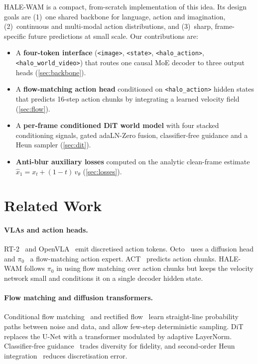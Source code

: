 \documentclass[11pt]{article}
\newcommand{\tok}[1]{\texttt{<#1>}}
\begin{document}
HALE-WAM is a compact, from-scratch implementation of this idea. Its design goals are
(1)~one shared backbone for language, action and imagination, (2)~continuous and multi-modal
action distributions, and (3)~sharp, frame-specific future predictions at small scale.
Our contributions are:
\begin{itemize}
  \item A \textbf{four-token interface} (\tok{image}, \tok{state}, \tok{halo\_action},
        \tok{halo\_world\_video}) that routes one causal MoE decoder to three output heads
        (\cref{sec:backbone}).
  \item A \textbf{flow-matching action head} conditioned on \tok{halo\_action} hidden
        states that predicts 16-step action chunks by integrating a learned velocity field
        (\cref{sec:flow}).
  \item A \textbf{per-frame conditioned DiT world model} with four stacked conditioning
        signals, gated adaLN-Zero fusion, classifier-free guidance and a Heun sampler
        (\cref{sec:dit}).
  \item \textbf{Anti-blur auxiliary losses} computed on the analytic clean-frame estimate
        $\hat x_1=x_t+(1-t)\,v_\theta$ (\cref{sec:losses}).
\end{itemize}

\section{Related Work}

\paragraph{VLAs and action heads.} RT-2~\cite{brohan2023rt2} and
OpenVLA~\cite{kim2024openvla} emit discretised action tokens. Octo~\cite{octo2024} uses a
diffusion head and $\pi_0$~\cite{black2024pi0} a flow-matching action expert. ACT~\cite{zhao2023aloha}
predicts action chunks. HALE-WAM follows $\pi_0$ in using flow matching over action chunks
but keeps the velocity network small and conditions it on a single decoder hidden state.

\paragraph{Flow matching and diffusion transformers.} Conditional flow
matching~\cite{lipman2023flow} and rectified flow~\cite{liu2023rectified} learn straight-line
probability paths between noise and data, and allow few-step deterministic sampling.
DiT~\cite{peebles2023dit} replaces the U-Net with a transformer modulated by adaptive
LayerNorm. Classifier-free guidance~\cite{ho2022cfg} trades diversity for fidelity, and
second-order Heun integration~\cite{karras2022edm} reduces discretisation error.
\end{document}
